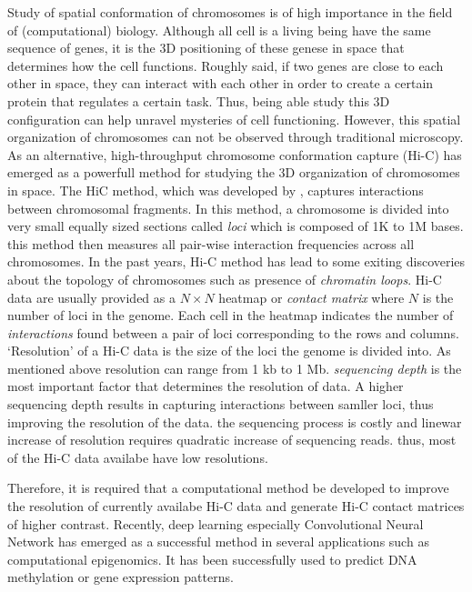 \documentclass{article}
\begin{document}
Study of spatial conformation of chromosomes is
of high importance in the field of (computational)
biology. Although all cell is a living being
have the same sequence of genes, it is the 
3D positioning of these genese in space that
determines how the cell functions.
Roughly said,
if two genes are close to each other in
space, they can interact with each other
in order to create a certain protein that
regulates a certain task.
Thus, being
able study this 3D configuration can help
unravel mysteries of cell functioning.
However, this spatial organization of chromosomes
can not be observed through traditional 
microscopy. As an alternative,
high-throughput chromosome conformation capture
(Hi-C) has emerged as
a powerfull method for studying the
3D organization of chromosomes in space.
The HiC method, which was developed by 
\cite{lieberman2009comprehensive}, 
captures interactions between
chromosomal fragments.
In this method, a chromosome is divided into
very small equally sized
sections called \textit{loci}
which is composed of 1K to 1M bases.
this method then
measures all pair-wise interaction frequencies 
across all chromosomes. 
In the past years, Hi-C method has lead to some
exiting discoveries about the topology of 
chromosomes such as presence of \textit{chromatin
loops}.
Hi-C data are usually provided as a $N \times N$
heatmap or \textit{contact matrix} where $N$ is 
the number of loci in the genome. Each cell in 
the heatmap indicates the number of \textit{interactions}
found between a pair of loci corresponding to the
rows and columns. `Resolution' of a Hi-C data
is the size of the loci the genome is
divided into.
As mentioned above
resolution can range from 1 kb to 1 Mb.
\textit{sequencing depth} is the most
important factor that determines the resolution
of data. A higher sequencing depth results in
capturing interactions between samller loci,
thus improving the resolution of the data.
the sequencing process is costly and 
linewar increase of resolution requires
quadratic increase of sequencing reads.
thus, most of the Hi-C data availabe have
low resolutions.

Therefore, it is required that a computational
method be developed to improve the resolution of
currently availabe Hi-C data and generate Hi-C
contact matrices of higher contrast.
Recently, deep learning 
especially Convolutional Neural Network
has emerged as a successful
method in several applications such as 
computational epigenomics. It has been
successfully used to predict DNA methylation
or gene expression patterns.
\end{document}
